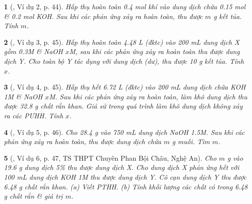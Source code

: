 \documentclass{article}
\newtheorem{baitoan}{}
\begin{document}
\begin{baitoan}[\cite{Truong_Long_Huong_bdhsg_Hoa_Hoc_9}, Ví dụ 2, p. 44]
	Hấp thụ hoàn toàn {\rm0.4 mol} khí {\rm{}} vào dung dịch chứa {\rm0.15 mol } \& {\rm0.2 mol KOH}. Sau khi các phản ứng xảy ra hoàn toàn, thu được $m$ {\rm g} kết tủa. Tính $m$.
\end{baitoan}

\begin{baitoan}[\cite{Truong_Long_Huong_bdhsg_Hoa_Hoc_9}, Ví dụ 3, p. 45]
	Hấp thụ hoàn toàn {\rm4.48 L } (đktc) vào {\rm200 mL} dung dịch X gồm {\rm{} 0.3M \& NaOH $x$M}, sau khi các phản ứng xảy ra hoàn toàn thu được dung dịch Y. Cho toàn bộ Y tác dụng với dung dịch {\rm{}} (dư), thu được {\rm10 g} kết tủa. Tính $x$.
\end{baitoan}

\begin{baitoan}[\cite{Truong_Long_Huong_bdhsg_Hoa_Hoc_9}, Ví dụ 4, p. 45]
	Hấp thụ hết {\rm6.72 L } (đktc) vào {\rm200 mL} dung dịch chứa {\rm KOH 1M} \& {\rm NaOH $x$M}. Sau khi các phản ứng xảy ra hoàn toàn, làm khô dung dịch thu được {\rm32.8 g} chất rắn khan. Giả sử trong quá trình làm khô dung dịch không xảy ra các {\rm PƯHH}. Tính $x$.
\end{baitoan}

\begin{baitoan}[\cite{Truong_Long_Huong_bdhsg_Hoa_Hoc_9}, Ví dụ 5, p. 46]
	Cho {\rm28.4 g } vào {\rm750 mL} dung dịch {\rm NaOH 1.5M}. Sau khi các phản ứng xảy ra hoàn toàn, thu được dung dịch chứa $m$ {\rm g} muối. Tìm $m$.
\end{baitoan}

\begin{baitoan}[\cite{Truong_Long_Huong_bdhsg_Hoa_Hoc_9}, Ví dụ 6, p. 47, TS THPT Chuyên Phan Bội Châu, Nghệ An]
	Cho $m$ {\rm g } vào {\rm19.6 g} dung dịch {\rm{} 5\%} thu được dung dịch X. Cho dung dịch X phản ứng hết với {\rm100 mL} dung dịch {\rm KOH 1M} thu được dung dịch Y. Cô cạn dung dịch Y thu được {\rm6.48 g} chất rắn khan. (a) Viết {\rm PTHH}. (b) Tính khối lượng các chất có trong {\rm6.48 g} chất rắn \& giá trị $m$.
\end{baitoan}


\printbibliography[heading=bibintoc]
\end{document}
